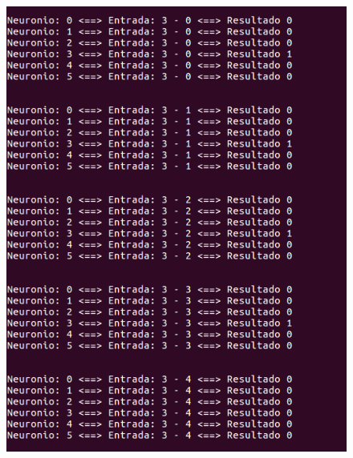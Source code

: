 \documentclass[hidelinks,12pt]{article}
\begin{document}
		\begin{figure}[!h]
			\centering
			\includegraphics[scale=0.5]{Figures/E3S3P1R.png}
		\end{figure}
		
\end{document}

